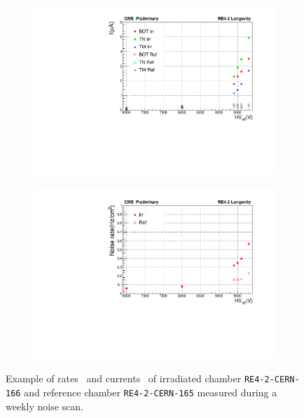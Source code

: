 	\begin{figure}[H]
    	\begin{subfigure}{0.5\linewidth}
			\centering
    		\includegraphics[width = \linewidth]{fig/chapt5/Weekly-noise-Scan-Currents.pdf}
        	\caption{\label{fig:weekly-noise:A}}
    	\end{subfigure}
    	\begin{subfigure}{0.5\linewidth}
			\centering
    		\includegraphics[width = \linewidth]{fig/chapt5/Weekly-noise-Scan-Rates.pdf}
        	\caption{\label{fig:weekly-noise:B}}
    	\end{subfigure}
		\caption{\label{fig:weekly-noise} Example of rates~ and currents~ of irradiated chamber \texttt{RE4-2-CERN-166} and reference chamber \texttt{RE4-2-CERN-165} measured during a weekly noise scan.}
	\end{figure}
	
